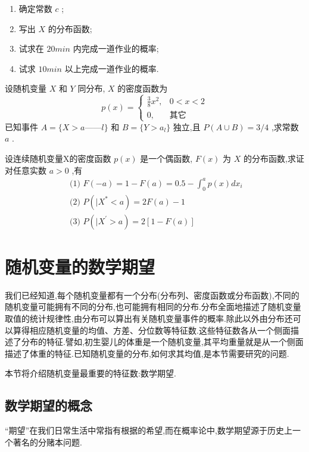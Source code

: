 \begin{xiti}
\begin{enumerate}
\item 确定常数 $ c $ ;
\item 写出 $ X $ 的分布函数;
\item 试求在 $ 20min $ 内完成一道作业的概率;
\item 试求 $ 10min $ 以上完成一道作业的概率.
\end{enumerate}
\item 设随机变量 $ X $ 和 $ Y $ 同分布, $ X $ 的密度函数为
\[ 
p(x)=\left\{\begin{array}{ll}
{\frac{3}{8} x^{2},} & {0<x<2} \\ 
{0,} & {\text{其它}}
\end{array}\right.
\]
已知事件 $ A=\{X>a——l\} $ 和 $ B=\{Y>a_l\} $ 独立,且 $ P(A \cup B)=3 / 4 $ ,求常数 $ a $ .
\item 设连续随机变量X的密度函数 $ p(x) $ 是一个偶函数, $ F(x) $ 为 $ X $ 的分布函数,求证对任意实数 $ a>0 $ ,有
\[ 
\begin{array}{l}{\text { (1) } F(-a)=1-F(a)=0.5-\int_{0}^{a} p(x) d x_{i}} \\ {\text { (2) } P\left( | X^{*}<a\right)=2 F(a)-1} \\ {\text { (3) } P\left( | X^{\prime}>a\right)=2[1-F(a)]}\end{array}
\]
\end{xiti}

\section{随机变量的数学期望}\label{sec:2.2}

我们已经知道,每个随机变量都有一个分布(分布列、密度函数或分布函数),不同的随机变量可能拥有不同的分布,也可能拥有相同的分布.分布全面地描述了随机变量取值的统计规律性,由分布可以算出有关随机变量事件的概率.除此以外由分布还可以算得相应随机变量的均值、方差、分位数等特征数.这些特征数各从一个侧面描述了分布的特征.譬如,初生婴儿的体重是一个随机变量,其平均重量就是从一个侧面描述了体重的特征.已知随机变量的分布,如何求其均值,是本节需要研究的问题.

本节将介绍随机变量最重要的特征数:数学期望.

\subsection{数学期望的概念}\label{ssec:2.2.1}

“期望”在我们日常生活中常指有根据的希望,而在概率论中,数学期望源于历史上一个著名的分赌本问题.

